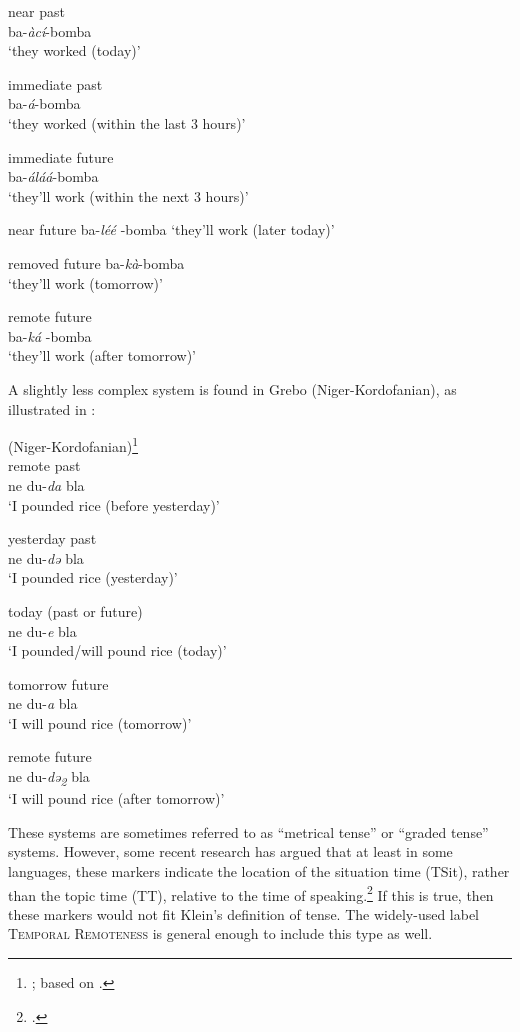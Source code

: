 \ex near past \\
    ba-\textit{àcí}-bomba   \\
\glt‘they worked (today)’

\ex immediate past \\
   ba-\textit{á}-bomba   \\
\glt‘they worked (within the last 3 hours)’

\ex immediate future   \\
 ba-\textit{áláá}-bomba \\  
\glt‘they’ll work (within the next 3 hours)’

\ex near future  
  ba-\textit{léé} -bomba   
\glt‘they’ll work (later today)’

\ex  removed future  
 ba-\textit{kà}-bomba  \\ 
\glt‘they’ll work (tomorrow)’

\ex  remote future   \\
ba-\textit{ká} -bomba   \\
\glt ‘they’ll work (after tomorrow)’
\z
\z

A slightly less complex system is found in Grebo (Niger-Kordofanian), as illustrated in :

\ea \label{ex:21.38} 
{ (Niger-Kordofanian)}\footnote{\citet[365–367]{Frawley1992}; based on \citet{Innes1966}.} \\
\ea  remote past \\
ne du-\textit{da} bla \\ 
\glt‘I pounded rice (before yesterday)’

\ex yesterday past\\
ne du-\textit{də} bla\\
\glt ‘I pounded rice (yesterday)’ 

\ex today (past or future) \\
ne du-\textit{e} bla \\ 
\glt‘I pounded/will pound rice (today)’

\ex tomorrow future \\
ne du-\textit{a} bla \\
\glt‘I will pound rice (tomorrow)’

\ex remote future \\
ne du-\textit{də\textsubscript{2}} bla \\ 
\glt‘I will pound rice (after tomorrow)’
\z
\z

\largerpage
These systems are sometimes referred to as “metrical tense” or “graded tense” systems. However, some recent research has argued that at least in some languages, these markers indicate the location of the situation time (TSit), rather than the topic time (TT), relative to the time of speaking.\footnote{\citet{Cable2013,LaCross2016}.} If this is true, then these markers would not fit Klein’s definition of tense. The widely-used label \textsc{Temporal Remoteness} is general enough to include this type as well.



